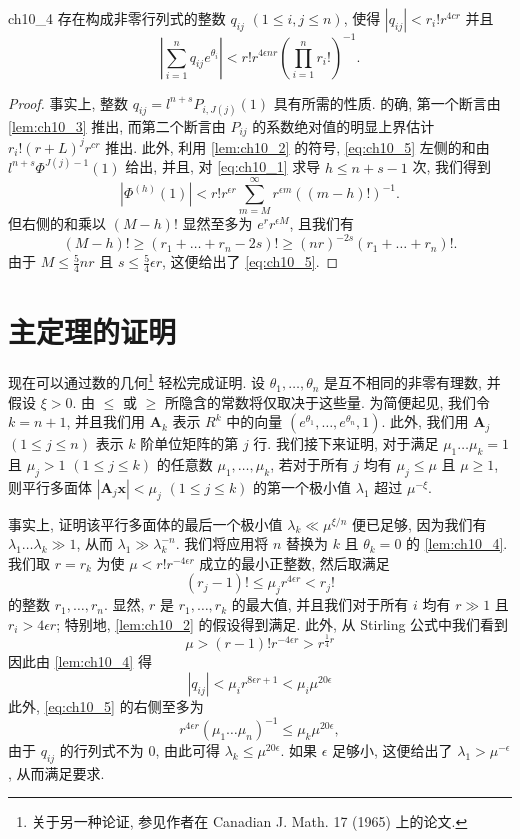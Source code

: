 \begin{mylemma}{}{ch10_4}
存在构成非零行列式的整数 $q_{ij}$ $(1 \le i, j \le n)$, 使得 $|q_{ij}| < r_i! r^{4cr}$ 并且
\[\left| \sum_{i=1}^{n} q_{ij} e^{\theta_i} \right| < r! r^{4\epsilon n r} \left( \prod_{i=1}^{n} r_i! \right)^{-1}. \tag{5}\label{eq:ch10_5}\]
\end{mylemma}

\begin{proof}
事实上, 整数 $q_{ij} = l^{n+s}P_{i,J(j)}(1)$ 具有所需的性质. 的确, 第一个断言由 \autoref{lem:ch10_3} 推出, 而第二个断言由 $P_{ij}$ 的系数绝对值的明显上界估计 $r_i! (r+L)^j r^{cr}$ 推出. 此外, 利用 \autoref{lem:ch10_2} 的符号, \eqref{eq:ch10_5} 左侧的和由 $l^{n+s}\Phi^{J(j)-1}(1)$ 给出, 并且, 对 \eqref{eq:ch10_1} 求导 $h \leq n+s-1$ 次, 我们得到
\[|\Phi^{(h)}(1)| < r! r^{\epsilon r} \sum_{m=M}^{\infty} r^{\epsilon m} ((m-h)!)^{-1}.\]
但右侧的和乘以 $(M-h)!$ 显然至多为 $e^r r^{\epsilon M}$, 且我们有
\[(M-h)! \geqslant (r_1 + \ldots + r_n - 2s)! \geqslant (nr)^{-2s} (r_1 + \ldots + r_n)!.\]
由于 $M \leq \frac{5}{4} nr$ 且 $s \leq \frac{5}{4} \epsilon r$, 这便给出了 \eqref{eq:ch10_5}.
\end{proof}

\section{主定理的证明}\label{sec:ch10_3}

现在可以通过数的几何\footnote{关于另一种论证, 参见作者在 Canadian J. Math. 17 (1965) 上的论文.} 轻松完成证明. 设 $\theta_1, \ldots, \theta_n$ 是互不相同的非零有理数, 并假设 $\xi > 0$. 由 $\leqslant$ 或 $\geqslant$ 所隐含的常数将仅取决于这些量. 为简便起见, 我们令 $k = n + 1$, 并且我们用 $\mathbf{A}_k$ 表示 $R^k$ 中的向量 $(e^{\theta_1}, \ldots, e^{\theta_n}, 1)$. 此外, 我们用 $\mathbf{A}_j$ $(1 \leqslant j \leqslant n)$ 表示 $k$ 阶单位矩阵的第 $j$ 行. 我们接下来证明, 对于满足 $\mu_1 \ldots \mu_k = 1$ 且 $\mu_j > 1$ $(1 \leqslant j \leqslant k)$ 的任意数 $\mu_1, \ldots, \mu_k$, 若对于所有 $j$ 均有 $\mu_j \leqslant \mu$ 且 $\mu \geqslant 1$, 则平行多面体 $|\mathbf{A}_j \mathbf{x}| < \mu_j$ $(1 \leqslant j \leqslant k)$ 的第一个极小值 $\lambda_1$ 超过 $\mu^{-\xi}$.

事实上, 证明该平行多面体的最后一个极小值 $\lambda_k \ll \mu^{\xi/n}$ 便已足够, 因为我们有 $\lambda_1 \dots \lambda_k \gg 1$, 从而 $\lambda_1 \gg \lambda_k^{-n}$. 我们将应用将 $n$ 替换为 $k$ 且 $\theta_k = 0$ 的 \autoref{lem:ch10_4}. 我们取 $r = r_k$ 为使 $\mu < r! r^{-4\epsilon r}$ 成立的最小正整数, 然后取满足
\[(r_j-1)!\leqslant \mu_j r^{4\epsilon r}< r_j!\]
的整数 $r_1, \dots, r_n$. 显然, $r$ 是 $r_1, \ldots, r_k$ 的最大值, 并且我们对于所有 $i$ 均有 $r \gg 1$ 且 $r_i > 4\epsilon r$; 特别地, \autoref{lem:ch10_2} 的假设得到满足. 此外, 从 Stirling 公式中我们看到
\[\mu > (r-1)! r^{-4\epsilon r} > r^{\frac{1}{4}r}\]
因此由 \autoref{lem:ch10_4} 得
\[|q_{ij}| < \mu_i r^{8\epsilon r + 1} < \mu_i \mu^{20\epsilon}\]
此外, \eqref{eq:ch10_5} 的右侧至多为
\[r^{4\epsilon r}(\mu_1\dots\mu_n)^{-1}\leqslant \mu_k\mu^{20\epsilon},\]
由于 $q_{ij}$ 的行列式不为 0, 由此可得 $\lambda_k \leq \mu^{20\epsilon}$. 如果 $\epsilon$ 足够小, 这便给出了 $\lambda_1 > \mu^{-\epsilon}$, 从而满足要求.

